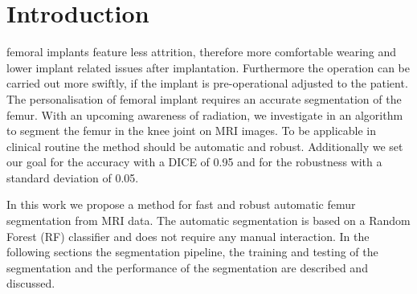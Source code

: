 \section{Introduction}
 femoral implants feature less attrition, therefore more comfortable wearing and lower implant related issues after implantation. Furthermore the operation can be carried out more swiftly, if the implant is pre-operational adjusted to the patient. The personalisation of femoral implant requires an accurate segmentation of the femur. With an upcoming awareness of radiation, we investigate in an algorithm to segment the femur in the knee joint on MRI images. To be applicable in clinical routine the method should be automatic and robust. Additionally we set our goal for the accuracy with a DICE of 0.95 and for the robustness with a standard deviation of 0.05.

In this work we propose a method for fast and robust automatic femur segmentation from MRI data. The automatic segmentation is based on a Random Forest (RF) classifier \cite{rf} and does not require any manual interaction. In the following sections the segmentation pipeline, the training and testing of the segmentation and the performance of the segmentation are described and discussed.